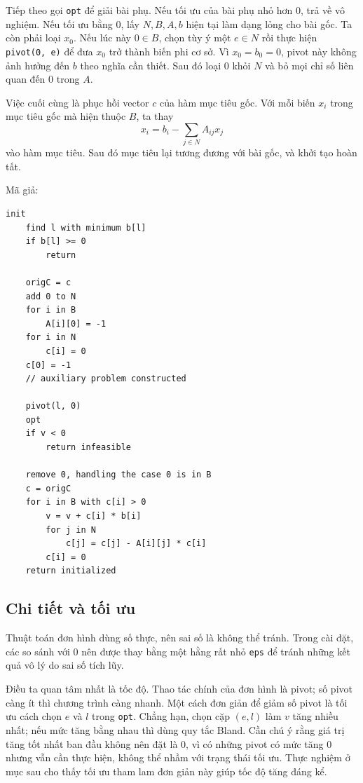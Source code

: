 \documentclass[11pt]{article}
\begin{document}
Tiếp theo gọi \texttt{opt} để giải bài phụ. Nếu tối ưu của bài phụ nhỏ hơn
$0$, trả về vô nghiệm. Nếu tối ưu bằng $0$, lấy $N,B,A,b$ hiện tại làm dạng
lỏng cho bài gốc. Ta còn phải loại $x_0$. Nếu lúc này $0\in B$, chọn tùy ý
một $e\in N$ rồi thực hiện \texttt{pivot(0, e)} để đưa $x_0$ trở thành biến
phi cơ sở. Vì $x_0=b_0=0$, pivot này không ảnh hưởng đến $b$ theo nghĩa cần
thiết. Sau đó loại $0$ khỏi $N$ và bỏ mọi chỉ số liên quan đến $0$ trong
$A$.

Việc cuối cùng là phục hồi vector $c$ của hàm mục tiêu gốc. Với mỗi biến
$x_i$ trong mục tiêu gốc mà hiện thuộc $B$, ta thay
\[
  x_i=b_i-\sum_{j\in N} A_{ij}x_j
\]
vào hàm mục tiêu. Sau đó mục tiêu lại tương đương với bài gốc, và khởi tạo
hoàn tất.

Mã giả:
\begin{verbatim}
init
    find l with minimum b[l]
    if b[l] >= 0
        return

    origC = c
    add 0 to N
    for i in B
        A[i][0] = -1
    for i in N
        c[i] = 0
    c[0] = -1
    // auxiliary problem constructed

    pivot(l, 0)
    opt
    if v < 0
        return infeasible

    remove 0, handling the case 0 is in B
    c = origC
    for i in B with c[i] > 0
        v = v + c[i] * b[i]
        for j in N
            c[j] = c[j] - A[i][j] * c[i]
        c[i] = 0
    return initialized
\end{verbatim}

\subsection{Chi tiết và tối ưu}

Thuật toán đơn hình dùng số thực, nên sai số là không thể tránh. Trong cài
đặt, các so sánh với $0$ nên được thay bằng một hằng rất nhỏ \texttt{eps} để
tránh những kết quả vô lý do sai số tích lũy.

Điều ta quan tâm nhất là tốc độ. Thao tác chính của đơn hình là pivot; số
pivot càng ít thì chương trình càng nhanh. Một cách đơn giản để giảm số
pivot là tối ưu cách chọn $e$ và $l$ trong \texttt{opt}. Chẳng hạn, chọn cặp
$(e,l)$ làm $v$ tăng nhiều nhất; nếu mức tăng bằng nhau thì dùng quy tắc
Bland. Cần chú ý rằng giá trị tăng tốt nhất ban đầu không nên đặt là $0$, vì
có những pivot có mức tăng $0$ nhưng vẫn cần thực hiện, không thể nhầm với
trạng thái tối ưu. Thực nghiệm ở mục sau cho thấy tối ưu tham lam đơn giản
này giúp tốc độ tăng đáng kể.
\end{document}
